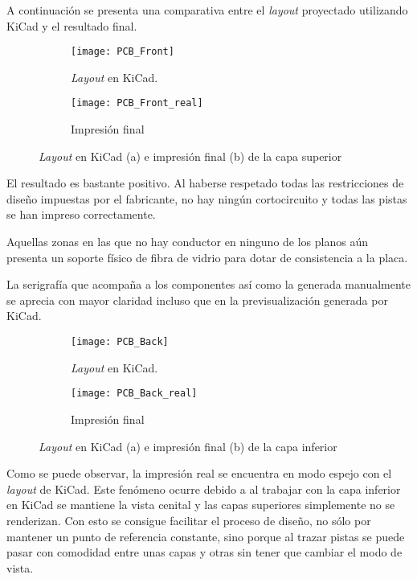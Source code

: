 A continuación se presenta una comparativa entre el \textit{layout} proyectado utilizando KiCad y el resultado final.

\begin{figure}[h]
  \begin{subfigure}[b]{8cm}
   	\centering
    \texttt{[image: PCB\_Front]}
    \caption{\textit{Layout} en KiCad.}
    \label{fig:PCB_Front}
  \end{subfigure}
  \hfill
  \begin{subfigure}[b]{8cm}
  	\centering
    \texttt{[image: PCB\_Front\_real]}
    \caption{Impresión final}
    \label{fig:PCB_Front_real}
  \end{subfigure}
  \caption{\textit{Layout} en KiCad (a) e impresión final (b) de la capa superior}
  \label{fig:PCB_Front_completa}
\end{figure}

El resultado es bastante positivo. Al haberse respetado todas las restricciones de diseño impuestas por el fabricante, no hay ningún cortocircuito y todas las pistas se han impreso correctamente.

Aquellas zonas en las que no hay conductor en ninguno de los planos aún presenta un soporte físico de fibra de vidrio para dotar de consistencia a la placa.

La serigrafía que acompaña a los componentes así como la generada manualmente se aprecia con mayor claridad incluso que en la previsualización generada por KiCad.

\clearpage

\begin{figure}[h]
  \begin{subfigure}[b]{8cm}
   	\centering
    \texttt{[image: PCB\_Back]}
    \caption{\textit{Layout} en KiCad.}
    \label{fig:PCB_Back}
  \end{subfigure}
  \hfill
  \begin{subfigure}[b]{8cm}
  	\centering
    \texttt{[image: PCB\_Back\_real]}
    \caption{Impresión final}
    \label{fig:PCB_Back_real}
  \end{subfigure}
  \caption{\textit{Layout} en KiCad (a) e impresión final (b) de la capa inferior}
  \label{fig:PCB_Back_completa}
\end{figure}

Como se puede observar, la impresión real se encuentra en modo espejo con el \textit{layout} de KiCad. Este fenómeno ocurre debido a  al trabajar con la capa inferior en KiCad se mantiene la vista cenital y las capas superiores simplemente no se renderizan. Con esto se consigue facilitar el proceso de diseño, no sólo por mantener un punto de referencia constante, sino porque al trazar pistas se puede pasar con comodidad entre unas capas y otras sin tener que cambiar el modo de vista.

